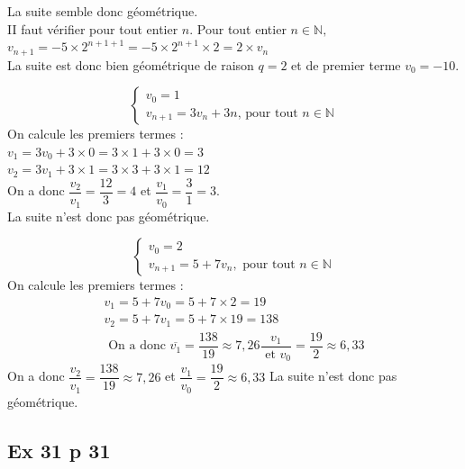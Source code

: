 \documentclass[a4paper,french]{book}
\begin{document}
\begin{enumMet}
    La suite semble donc géométrique.\\
    II faut vérifier pour tout entier $n$. Pour tout entier $n \in \mathbb{N},$\\
    $ v_{n+1}=-5 \times 2^{n+1+1}=-5 \times 2^{n+1} \times 2=2 \times v_{n}$\\
    La suite est donc bien géométrique de raison $q=2$ et de premier terme $v_{0}=-10$.
    \item $$
    \left\{\begin{array}{l}
    v_{0}=1 \\
    v_{n+1}=3 v_{n}+3 n \text {, pour tout } n \in \mathbb{N}
    \end{array}\right.
    $$
    On calcule les premiers termes :\\
    $v_{1}=3 v_{0}+3 \times 0=3 \times 1+3 \times 0=3$\\
    $v_{2}=3 v_{1}+3 \times 1=3 \times 3+3 \times 1=12$\\
    On a donc $\dfrac{v_{2}}{v_{1}}=\dfrac{12}{3}=4$ et $\dfrac{v_{1}}{v_{0}}=\dfrac{3}{1}=3$.\\
    La suite n'est donc pas géométrique.
    \item $$
    \left\{\begin{array}{l}
    v_{0}=2 \\
    v_{n+1}=5+7 v_{n}, \text { pour tout } n \in \mathbb{N}
    \end{array}\right.
    $$
    On calcule les premiers termes :
    $$
    \begin{array}{l}
    v_{1}=5+7 v_{0}=5+7 \times 2=19 \\
    v_{2}=5+7 v_{1}=5+7 \times 19=138 \\
    \text { On a donc } \overline{v_{1}}=\dfrac{138}{19} \approx 7,26 \dfrac{v_{1}}{\text { et } v_{0}}=\dfrac{19}{2} \approx 6,33
    \end{array}
    $$
    On a donc $\dfrac{v_{2}}{v_{1}}=\dfrac{138}{19} \approx 7,26$ et $\dfrac{v_{1}}{v_0}=\dfrac{19}{2} \approx 6,33$ La suite n'est donc pas géométrique.
\end{enumMet}

\subsection*{Ex 31 p 31}
\begin{enumMet}
    \item 
\end{enumMet}
\end{document}
